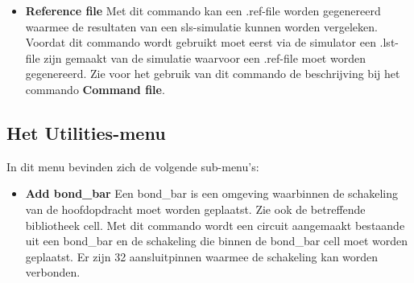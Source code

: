 \begin{itemize}
\item{\bf Reference file}
Met dit commando kan een .ref-file worden gegenereerd waarmee de resultaten
van een sls-simulatie kunnen worden vergeleken.
Voordat dit commando wordt gebruikt moet eerst via de simulator een .lst-file
zijn gemaakt van de simulatie waarvoor een .ref-file moet worden gegenereerd.
Zie voor het gebruik van dit commando de beschrijving bij het commando {\bf Command file}.

\end{itemize}

\subsection{Het Utilities-menu}
In dit menu bevinden zich de volgende sub-menu's:
\begin{itemize}
\item{\bf Add bond\_bar}
Een bond\_bar is een omgeving waarbinnen de schakeling van de hoofdopdracht
moet worden geplaatst. Zie ook de betreffende bibliotheek cell.
Met dit commando wordt een circuit aangemaakt bestaande uit een bond\_bar
en de schakeling die binnen de bond\_bar cell moet worden geplaatst.
Er zijn 32 aansluitpinnen waarmee de schakeling kan worden verbonden.


\end{itemize}
